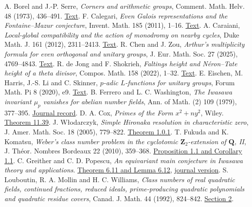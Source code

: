  A. Borel and J.-P. Serre, \emph{Corners and arithmetic groups}, Comment. Math. Helv. 48 (1973), 436--491. \href{https://doi.org/10.1007/BF02566134}{Text}.
 F. Calegari, \emph{Even Galois representations and the Fontaine--Mazur conjecture}, Invent. Math. 185 (2011), 1--16. \href{https://doi.org/10.1007/s00222-010-0297-0}{Text}.
 A. Caraiani, \emph{Local-global compatibility and the action of monodromy on nearby cycles}, Duke Math. J. 161 (2012), 2311--2413. \href{https://www.ma.imperial.ac.uk/~acaraian/papers/lgc1.pdf}{Text}.
 R. Chen and J. Zou, \emph{Arthur's multiplicity formula for even orthogonal and unitary groups}, J. Eur. Math. Soc. 27 (2025), 4769--4843. \href{https://doi.org/10.4171/JEMS/1564}{Text}.
 R. de Jong and F. Shokrieh, \emph{Faltings height and Néron--Tate height of a theta divisor}, Compos. Math. 158 (2022), 1--32. \href{https://doi.org/10.1112/S0010437X21007661}{Text}.
 E. Eischen, M. Harris, J.-S. Li and C. Skinner, \emph{$p$-adic $L$-functions for unitary groups}, Forum Math. Pi 8 (2020), e9. \href{https://arxiv.org/pdf/1602.01776}{Text}.
 B. Ferrero and L. C. Washington, \emph{The Iwasawa invariant $\mu_p$ vanishes for abelian number fields}, Ann. of Math. (2) 109 (1979), 377--395. \href{https://annals.math.princeton.edu/1979/190-2/p05}{Journal record}.
 D. A. Cox, \emph{Primes of the Form \(x^2+ny^2\)}, Wiley. \href{https://www.math.utoronto.ca/~ila/Cox-Primes_of_the_form_x2%2Bny2.pdf}{Theorem 11.39}.
 J. W{\l}odarczyk, \emph{Simple Hironaka resolution in characteristic zero}, J. Amer. Math. Soc. 18 (2005), 779--822. \href{https://www.math.purdue.edu/~wlodarcz/singularities/Resolution.pdf}{Theorem 1.0.1}.
 T. Fukuda and K. Komatsu, \emph{Weber's class number problem in the cyclotomic \(\mathbf Z_2\)-extension of \(\mathbf Q\), II}, J. Th\'eor. Nombres Bordeaux 22 (2010), 359--368. \href{https://doi.org/10.5802/jtnb.720}{Proposition 1.1 and Corollary 1.1}.
 C. Greither and C. D. Popescu, \emph{An equivariant main conjecture in Iwasawa theory and applications}. \href{https://arxiv.org/pdf/1103.3069}{Theorem 6.11 and Lemma 6.12}, \href{https://doi.org/10.1090/jag/635}{journal version}.
 S. Louboutin, R. A. Mollin and H. C. Williams, \emph{Class numbers of real quadratic fields, continued fractions, reduced ideals, prime-producing quadratic polynomials and quadratic residue covers}, Canad. J. Math. 44 (1992), 824--842. \href{https://doi.org/10.4153/CJM-1992-049-0}{Section 2}.

